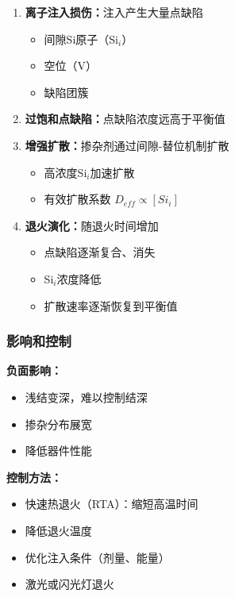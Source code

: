 \documentclass[UTF8,12pt,a4paper]{ctexart}
\begin{document}
\begin{enumerate}
    \item \textbf{离子注入损伤：}注入产生大量点缺陷
    \begin{itemize}
        \item 间隙Si原子（Si$_i$）
        \item 空位（V）
        \item 缺陷团簇
    \end{itemize}
    
    \item \textbf{过饱和点缺陷：}点缺陷浓度远高于平衡值
    
    \item \textbf{增强扩散：}掺杂剂通过间隙-替位机制扩散
    \begin{itemize}
        \item 高浓度Si$_i$加速扩散
        \item 有效扩散系数 $D_{eff} \propto [Si_i]$
    \end{itemize}
    
    \item \textbf{退火演化：}随退火时间增加
    \begin{itemize}
        \item 点缺陷逐渐复合、消失
        \item Si$_i$浓度降低
        \item 扩散速率逐渐恢复到平衡值
    \end{itemize}
\end{enumerate}

\subsubsection{影响和控制}

\textbf{负面影响：}
\begin{itemize}
    \item 浅结变深，难以控制结深
    \item 掺杂分布展宽
    \item 降低器件性能
\end{itemize}

\textbf{控制方法：}
\begin{itemize}
    \item 快速热退火（RTA）：缩短高温时间
    \item 降低退火温度
    \item 优化注入条件（剂量、能量）
    \item 激光或闪光灯退火
\end{itemize}
\end{document}
